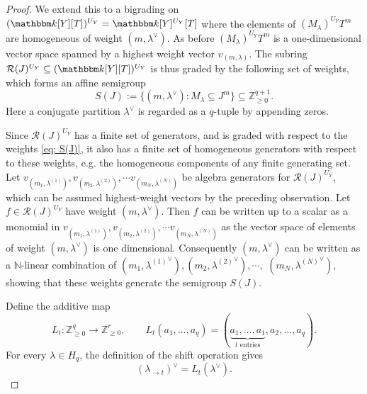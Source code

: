 \documentclass[11pt, reqno]{amsart}
\numberwithin{equation}{section}
\theoremstyle{definition}
\newcommand{\ZZ}{{\mathbb Z}}
\newcommand{\NN}{{\mathbb N}}
\newcommand{\kk}{{\mathbbm k}}
\renewcommand{\l}{\lambda}
\begin{document}
\begin{proof}
We extend this to a bigrading on $(\kk[Y][T])^{U_Y}=\kk[Y]^{U_Y}[T]$ where the elements of  $(M_\lambda)^{U_Y}T^m$ are homogeneous of weight $(m,\l^\vee)$. As before  $(M_\lambda)^{U_Y}T^m$ is  a one-dimensional vector space spanned by a highest weight vector $v_{(m,\l)}$.
The subring $\mathcal R(J)^{U_Y}\subseteq (\kk[Y][T])^{U_Y}$ is thus graded by the following set of weights, which forms an affine semigroup
\begin{equation}\label{eq: S(J)}
S(J):=\bigl\{(m,\lambda^\vee): M_\lambda \subseteq J^m\bigr\} \subseteq \ZZ_{\geq0}^{q+1}.
\end{equation}
Here a conjugate partition $\lambda^\vee$ is regarded
as a  $q$-tuple by appending zeros.

Since $\mathcal R(J)^{U_Y}$ has  a finite set of generators, and is graded with respect to the weights \eqref{eq: S(J)}, it also has a finite set of homogeneous generators with respect to these weights, e.g.  the homogeneous components of any finite generating set. Let $v_{(m_1,\l^{(1)})}, v_{(m_2,\l^{(2)})}, \cdots v_{(m_N,\l^{(N)})}$ be algebra generators for $\mathcal R(J)^{U_Y}$, which can be assumed highest-weight vectors by the preceding observation. Let $f\in \mathcal R(J)^{U_Y}$ have weight $(m, \lambda^\vee)$. Then $f$ can be written up to a scalar as a monomial in  $v_{(m_1,\l^{(1)})}, v_{(m_2,\l^{(2)})}, \cdots v_{(m_N,\l^{(N)})}$ as the vector space of elements of weight $(m, \lambda^\vee)$ is one dimensional. Consequently $(m, \lambda^\vee)$ can be written as a $\NN$-linear combination of $(m_1,{\l^{(1)}}^\vee), (m_2,{\l^{(2)}}^\vee), \cdots,$ $(m_N,{\l^{(N)}}^\vee)$, showing that these weights generate the semigroup $S(J)$.

Define the additive map
\[
L_t:\ZZ_{\geq0}^{q}\longrightarrow\ZZ_{\geq0}^{r},
\qquad
L_t(a_1,\ldots,a_q)
   =(\underbrace{a_1,\ldots,a_1}_{t\text{ entries}},a_2,\ldots,a_q).
\]
For every $\lambda\in H_q$, the definition of the shift operation gives
\begin{equation}\label{eq: conjugate shift}
(\lambda_{\rightarrow t})^\vee=L_t(\lambda^\vee).
\end{equation}


\end{proof}
\end{document}
